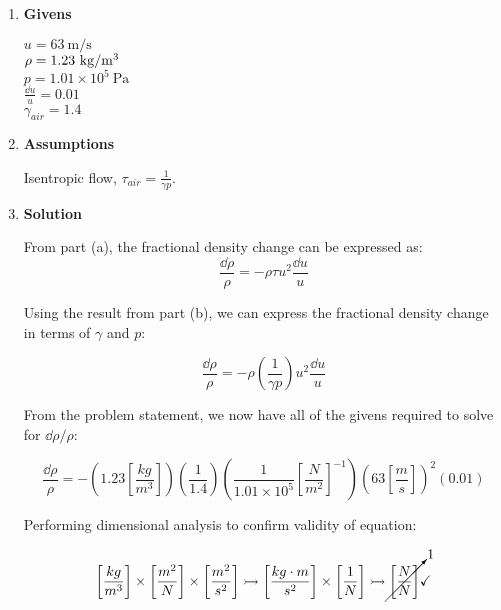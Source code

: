 \documentclass[12pt,letterpaper]{article}
\begin{document}
\begin{enumerate}[label=(\alph*)]
		\begin{enumerate}[label=\arabic*.]
			
			\item{\textbf{Givens}} \\
			$u = 63 \ \mathrm{m/s}$\\
			$\rho = 1.23 \ \mathrm{kg/m\textsuperscript{3}}$\\
			$p = 1.01 \times 10^5 \  \mathrm{Pa}$\\
			$\frac{\dd u}{u} = 0.01$\\
			$\gamma_{air} = 1.4$\\		
			
			\item{\textbf{Assumptions}} \\
			Isentropic flow, $\tau_{air} = \frac{1}{\gamma p}$.
			
			\item{\textbf{Solution}} \\
			
			From part (a), the fractional density change can be expressed as:
			\begin{equation*}
				\frac{\dd \rho}{\rho} = - \rho \tau u^2 \frac{\dd u}{u}
			\end{equation*}
		
			Using the result from part (b), we can express the fractional density change in terms of $\gamma$ and $p$:
			
			\begin{equation*}
				\frac{\dd \rho}{\rho} = - \rho \left( \frac{1}{\gamma p} \right) u^2 \frac{\dd u}{u}
			\end{equation*}
			
			From the problem statement, we now have all of the givens required to solve for $\dd \rho / \rho$:
			
			\begin{equation*}
				\frac{\dd \rho}{\rho} = - \left(1.23\left[\frac{kg}{m^3}\right]\right) \left(\frac{1}{1.4}\right)\left(\frac{1}{1.01 \times 10^5}\left[\frac{N}{m^2}\right]^{-1} \right) \left(63 \left[\frac{m}{s}\right]\right)^2 \left(0.01\right)
			\end{equation*}

			Performing dimensional analysis to confirm validity of equation:
			
			\begin{equation*}
				\left[\frac{kg}{m^3}\right] \times \left[\frac{m^2}{N}\right] \times \left[\frac{m^2}{s^2}\right] \rightarrowtail \left[\frac{kg \cdot m}{s^2}\right] \times \left[\frac{1}{N}\right] \rightarrowtail \cancelto{1}{\left[\frac{N}{N}\right]} \checkmark
			\end{equation*}


\end{enumerate}
\end{enumerate}
\end{document}
